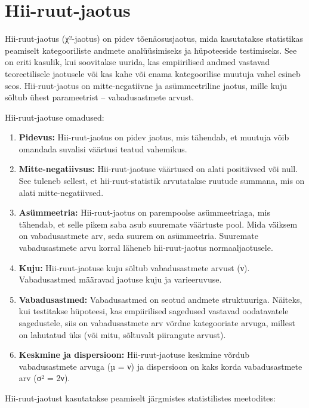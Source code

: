 \documentclass[
]{book}
\providecommand{\tightlist}{%
  \setlength{\itemsep}{0pt}\setlength{\parskip}{0pt}}
\begin{document}
\section{Hii-ruut-jaotus}\label{hii-ruut-jaotus}

Hii-ruut-jaotus (χ²-jaotus) on pidev tõenäosusjaotus, mida kasutatakse statistikas peamiselt kategooriliste andmete analüüsimiseks ja hüpoteeside testimiseks. See on eriti kasulik, kui soovitakse uurida, kas empiirilised andmed vastavad teoreetilisele jaotusele või kas kahe või enama kategoorilise muutuja vahel esineb seos. Hii-ruut-jaotus on mitte-negatiivne ja asümmeetriline jaotus, mille kuju sõltub ühest parameetrist -- vabadusastmete arvust.

Hii-ruut-jaotuse omadused:

\begin{enumerate}
\def\labelenumi{\arabic{enumi}.}
\tightlist
\item
  \textbf{Pidevus:} Hii-ruut-jaotus on pidev jaotus, mis tähendab, et muutuja võib omandada suvalisi väärtusi teatud vahemikus.
\item
  \textbf{Mitte-negatiivsus:} Hii-ruut-jaotuse väärtused on alati positiivsed või null. See tuleneb sellest, et hii-ruut-statistik arvutatakse ruutude summana, mis on alati mitte-negatiivsed.
\item
  \textbf{Asümmeetria:} Hii-ruut-jaotus on parempoolse asümmeetriaga, mis tähendab, et selle pikem saba asub suuremate väärtuste pool. Mida väiksem on vabadusastmete arv, seda suurem on asümmeetria. Suuremate vabadusastmete arvu korral läheneb hii-ruut-jaotus normaaljaotusele.
\item
  \textbf{Kuju:} Hii-ruut-jaotuse kuju sõltub vabadusastmete arvust (ν). Vabadusastmed määravad jaotuse kuju ja varieeruvuse.
\item
  \textbf{Vabadusastmed:} Vabadusastmed on seotud andmete struktuuriga. Näiteks, kui testitakse hüpoteesi, kas empiirilised sagedused vastavad oodatavatele sagedustele, siis on vabadusastmete arv võrdne kategooriate arvuga, millest on lahutatud üks (või mitu, sõltuvalt piirangute arvust).
\item
  \textbf{Keskmine ja dispersioon:} Hii-ruut-jaotuse keskmine võrdub vabadusastmete arvuga (µ = ν) ja dispersioon on kaks korda vabadusastmete arv (σ² = 2ν).
\end{enumerate}

Hii-ruut-jaotust kasutatakse peamiselt järgmistes statistilistes meetodites:
\end{document}
